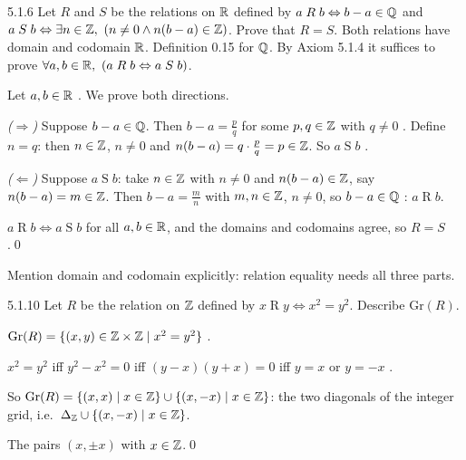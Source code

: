 \begin{bookex}[essential]{5.1.6}
Let $R$ and $S$ be the relations on $\mathbb{R}$ defined by $a\mathrel Rb\Leftrightarrow b-a\in\mathbb{Q}$ and $a\mathrel Sb\Leftrightarrow\exists n\in\mathbb{Z},\ (n\ne0\wedge n(b-a)\in\mathbb{Z})$. Prove that $R=S$.
\solution
\given Both relations have domain and codomain $\mathbb{R}$. Definition 0.15 for $\mathbb{Q}$.
\goal By Axiom 5.1.4 it suffices to prove $\forall a,b\in\mathbb{R},\ (a\mathrel Rb\Leftrightarrow a\mathrel Sb)$.
\begin{steps}
\item Let $a,b\in\mathbb{R}$ . We prove both directions.
\item \emph{($\Rightarrow$)} Suppose $b-a\in\mathbb{Q}$. Then $b-a=\frac pq$ for some $p,q\in\mathbb{Z}$ with $q\ne0$ . Define $n=q$: then $n\in\mathbb{Z}$, $n\ne0$ and $n(b-a)=q\cdot\frac pq=p\in\mathbb{Z}$. So $a\mathrel Sb$ .
\item \emph{($\Leftarrow$)} Suppose $a\mathrel Sb$: take $n\in\mathbb{Z}$ with $n\ne0$ and $n(b-a)\in\mathbb{Z}$, say $n(b-a)=m\in\mathbb{Z}$. Then $b-a=\frac mn$ with $m,n\in\mathbb{Z}$, $n\ne0$, so $b-a\in\mathbb{Q}$ : $a\mathrel Rb$.
\end{steps}
\conclusion $a\mathrel Rb\Leftrightarrow a\mathrel Sb$ for all $a,b\in\mathbb{R}$, and the domains and codomains agree, so $R=S$ .\qed
\begin{compare}
\item Mention domain and codomain explicitly: relation equality needs all three parts.
\end{compare}
\end{bookex}

\begin{bookex}[recommended]{5.1.10}
Let $R$ be the relation on $\mathbb{Z}$ defined by $x\mathrel Ry\Leftrightarrow x^2=y^2$. Describe $\mathrm{Gr}(R)$.
\solution
\begin{steps}
\item $\mathrm{Gr}(R)=\{(x,y)\in\mathbb{Z}\times\mathbb{Z}\mid x^2=y^2\}$ .
\item $x^2=y^2$ iff $y^2-x^2=0$ iff $(y-x)(y+x)=0$ iff $y=x$ or $y=-x$ .
\item So $\mathrm{Gr}(R)=\{(x,x)\mid x\in\mathbb{Z}\}\cup\{(x,-x)\mid x\in\mathbb{Z}\}$: the two diagonals of the integer grid, i.e.\ $\Delta_{\mathbb{Z}}\cup\{(x,-x)\mid x\in\mathbb{Z}\}$.
\end{steps}
\answer The pairs $(x,\pm x)$ with $x\in\mathbb{Z}$.\qed
\end{bookex}

